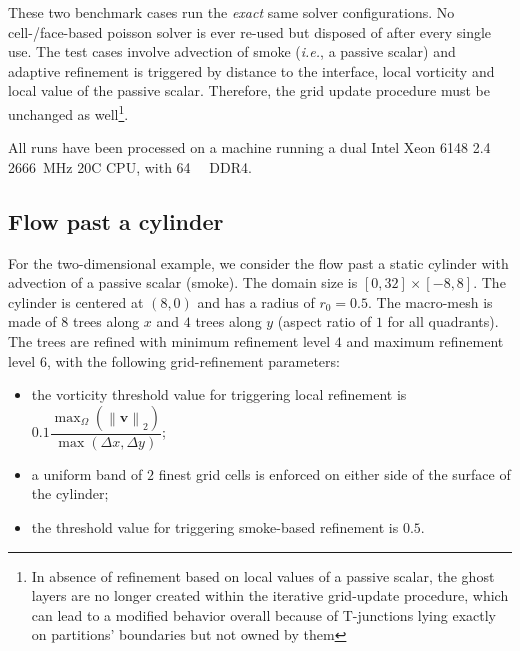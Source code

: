 \documentclass[11pt, a4paper]{article}
\theoremstyle{remark}
\begin{document}
These two benchmark cases run the \emph{exact} same solver configurations. No cell-/face-based poisson solver is ever re-used but disposed of after every single use. The test cases involve advection of smoke (\textit{i.e.}, a passive scalar) and adaptive refinement is triggered by distance to the interface, local vorticity and local value of the passive scalar. Therefore, the grid update procedure must be unchanged as well\footnote{In absence of refinement based on local values of a passive scalar, the ghost layers are no longer created within the iterative grid-update procedure, which can lead to a modified behavior overall because of T-junctions lying exactly on partitions' boundaries but not owned by them}. 

All runs have been processed on a machine running a dual Intel Xeon 6148 2.4 \SI{2666}{\mega\hertz} 20C CPU, with \SI{64}{\gibi\byte} DDR4.

\subsection{Flow past a cylinder}
\label{subsec:flow_past_cylinder_check}
For the two-dimensional example, we consider the flow past a static cylinder with advection of a passive scalar (smoke). The domain size is $\left[0, 32 \right]\times \left[ -8, 8\right]$. The cylinder is centered at $\left( 8, 0 \right)$ and has a radius of $r_{0} = 0.5$. The macro-mesh is made of $8$ trees along $x$ and $4$ trees along $y$ (aspect ratio of $1$ for all quadrants). The trees are refined with minimum refinement level $4$ and maximum refinement level $6$, with the following grid-refinement parameters:
\begin{itemize}
 \item the vorticity threshold value for triggering local refinement is $0.1\dfrac{\max_{\Omega}\left( \left\| \mathbf{v} \right\|_{2}\right)}{\max\left( \Delta x, \Delta y \right)}$;
 \item a uniform band of $2$ finest grid cells is enforced on either side of the surface of the cylinder;
 \item the threshold value for triggering smoke-based refinement is $0.5$.
\end{itemize}
\end{document}
